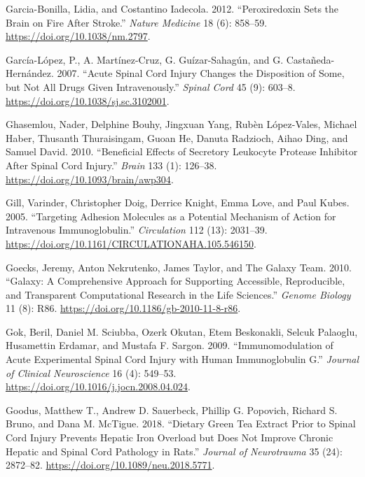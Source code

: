 \documentclass[9pt,lineno]{elife}
\newlength{\cslhangindent}
\newlength{\cslentryspacingunit} %
\newenvironment{CSLReferences}[2] %
 {%
  \setlength{\parindent}{0pt}
  \ifodd #1
  \let\oldpar\par
  \def\par{\hangindent=\cslhangindent\oldpar}
  \fi
  \setlength{\parskip}{#2\cslentryspacingunit}
 }%
 {}
\begin{document}
\begin{CSLReferences}{1}{0}
\leavevmode{}%
Garcia-Bonilla, Lidia, and Costantino Iadecola. 2012. {``Peroxiredoxin Sets the Brain on Fire After Stroke.''} \emph{Nature Medicine} 18 (6): 858--59. \url{https://doi.org/10.1038/nm.2797}.

\leavevmode{}%
García-López, P., A. Martínez-Cruz, G. Guízar-Sahagún, and G. Castañeda-Hernández. 2007. {``Acute Spinal Cord Injury Changes the Disposition of Some, but Not All Drugs Given Intravenously.''} \emph{Spinal Cord} 45 (9): 603--8. \url{https://doi.org/10.1038/sj.sc.3102001}.

\leavevmode{}%
Ghasemlou, Nader, Delphine Bouhy, Jingxuan Yang, Rubèn López-Vales, Michael Haber, Thusanth Thuraisingam, Guoan He, Danuta Radzioch, Aihao Ding, and Samuel David. 2010. {``Beneficial Effects of Secretory Leukocyte Protease Inhibitor After Spinal Cord Injury.''} \emph{Brain} 133 (1): 126--38. \url{https://doi.org/10.1093/brain/awp304}.

\leavevmode{}%
Gill, Varinder, Christopher Doig, Derrice Knight, Emma Love, and Paul Kubes. 2005. {``Targeting {Adhesion Molecules} as a {Potential Mechanism} of {Action} for {Intravenous Immunoglobulin}.''} \emph{Circulation} 112 (13): 2031--39. \url{https://doi.org/10.1161/CIRCULATIONAHA.105.546150}.

\leavevmode{}%
Goecks, Jeremy, Anton Nekrutenko, James Taylor, and The Galaxy Team. 2010. {``Galaxy: A Comprehensive Approach for Supporting Accessible, Reproducible, and Transparent Computational Research in the Life Sciences.''} \emph{Genome Biology} 11 (8): R86. \url{https://doi.org/10.1186/gb-2010-11-8-r86}.

\leavevmode{}%
Gok, Beril, Daniel M. Sciubba, Ozerk Okutan, Etem Beskonakli, Selcuk Palaoglu, Husamettin Erdamar, and Mustafa F. Sargon. 2009. {``Immunomodulation of Acute Experimental Spinal Cord Injury with Human Immunoglobulin {G}.''} \emph{Journal of Clinical Neuroscience} 16 (4): 549--53. \url{https://doi.org/10.1016/j.jocn.2008.04.024}.

\leavevmode{}%
Goodus, Matthew T., Andrew D. Sauerbeck, Phillip G. Popovich, Richard S. Bruno, and Dana M. McTigue. 2018. {``Dietary Green Tea Extract Prior to Spinal Cord Injury Prevents Hepatic Iron Overload but Does Not Improve Chronic Hepatic and Spinal Cord Pathology in Rats.''} \emph{Journal of Neurotrauma} 35 (24): 2872--82. \url{https://doi.org/10.1089/neu.2018.5771}.


\end{CSLReferences}
\end{document}
